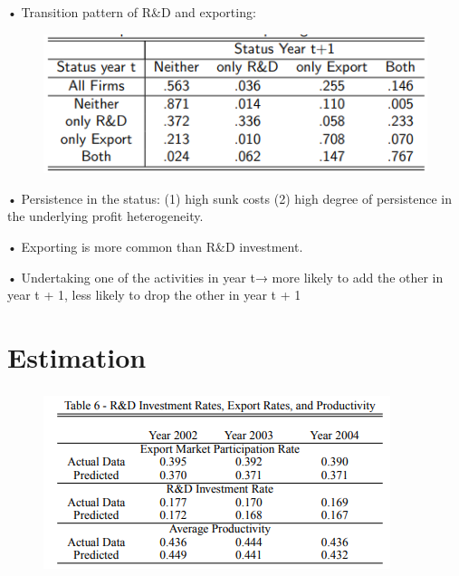 \documentclass[c, dvipsnames]{beamer}  %
\begin{document}
\begin{frame}[shrink=3]
\frametitle{\insertsection} 


• Transition pattern of R\&D and exporting:

\begin{figure}
\centering
\includegraphics[width=0.7\linewidth]{screenshot002}
\label{fig:screenshot001}
\end{figure}


• Persistence in the status: (1) high sunk costs (2) high degree of
persistence in the underlying profit heterogeneity.

• Exporting is more common than R\&D investment.

• Undertaking one of the activities in year t→ more likely to add the
other in year t + 1, less likely to drop the other in year t + 1


\end{frame}


\section{Estimation}


\begin{frame}[shrink=3]
\frametitle{\insertsection} 

\begin{figure}
	\centering
	\includegraphics[width=0.7\linewidth]{screenshot008}
	\label{fig:screenshot008}
\end{figure}


\end{frame}
\end{document}
